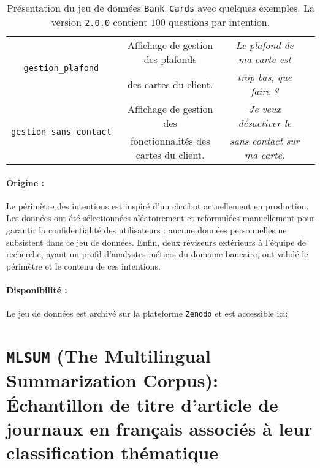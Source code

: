 \begin{table}[!htb]
\begin{center}
\begin{scriptsize}
\begin{tabular}{|c|c|c|c|}
				\tabularnewline
				\hline
			\multirow{2}{*}{\texttt{gestion\_plafond}}
				& Affichage de gestion des plafonds
				& \textit{Le plafond de ma carte est}
				\tabularnewline
				& des cartes du client.
				& \textit{trop bas, que faire ?}
				\tabularnewline
				\hline
			\multirow{2}{*}{\texttt{gestion\_sans\_contact}}
				& Affichage de gestion des
				& \textit{Je veux désactiver le}
				\tabularnewline
				& fonctionnalités des cartes du client.
				& \textit{sans contact sur ma carte.}
				\tabularnewline
				\hline
		\end{tabular}
		\end{scriptsize}
		\end{center}
		\caption{
			Présentation du jeu de données \texttt{Bank Cards} avec quelques exemples.
			La version \texttt{2.0.0} contient $100$ questions par intention.
		}
		\label{table:A.1-DATASET-BANK-CARDS}
	\end{table}
	
	\paragraph{Origine :}
	Le périmètre des intentions est inspiré d'un chatbot actuellement en production.
	Les données ont été sélectionnées aléatoirement et reformulées manuellement pour garantir la confidentialité des utilisateurs : aucune données personnelles ne subsistent dans ce jeu de données.
	Enfin, deux réviseurs extérieurs à l'équipe de recherche, ayant un profil d'analystes métiers du domaine bancaire, ont validé le périmètre et le contenu de ces intentions.
	
	\paragraph{Disponibilité :}
	Le jeu de données est archivé sur la plateforme \texttt{Zenodo} et est accessible ici: \cite{schild:2022:french-trainset-chatbots}


\section{\texttt{MLSUM} (The Multilingual Summarization Corpus): Échantillon de titre d'article de journaux en français associés à leur classification thématique}
\label{annex:A.2-DATASET-MLSUM-SUBSET-SCHILD}
	
